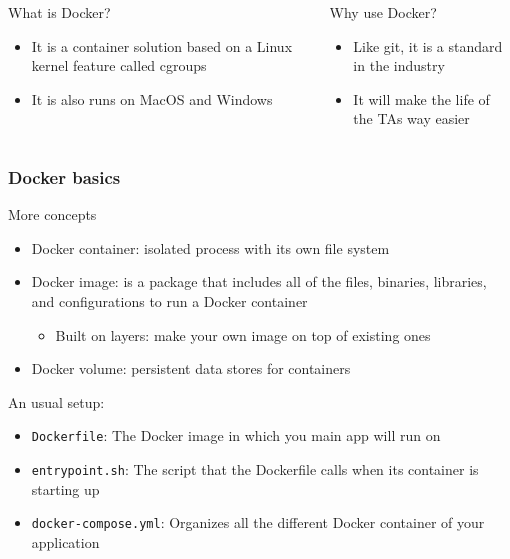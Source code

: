 \documentclass[fleqn,aspectratio=169,10pt]{beamer}
\begin{document}
\begin{frame}
\begin{columns}
\begin{column}{.45\textwidth}
\begin{block}{What is Docker?}
\begin{itemize}
            \pause
      \item It is a container solution based on a Linux kernel feature called cgroups
      \item It is also runs on MacOS and Windows
    \end{itemize}
  \end{block}
    \end{column}
    \pause
    \begin{column}{.45\textwidth}
      \begin{block}{Why use Docker?}
        \begin{itemize}
          \item Like git, it is a standard in the industry
          \item It will make the life of the TAs way easier
        \end{itemize}
      \end{block}
    \end{column}
  \end{columns}
\end{frame}

\begin{frame}[fragile]
  \frametitle{Docker basics}
  \pause
  \begin{block}{More concepts}
    \begin{itemize}
      \item Docker container: isolated process with its own file system
      \item Docker image: is a package that includes all of the files, binaries, libraries, and configurations to run a Docker container
            \begin{itemize}
              \item Built on layers: make your own image on top of existing ones
            \end{itemize}
            \item Docker volume: persistent data stores for containers
    \end{itemize}
  \end{block}
  \pause
  \begin{block}{An usual setup:}
    \begin{itemize}
      \item \texttt{Dockerfile}: The Docker image in which you main app will run on
      \item \texttt{entrypoint.sh}: The script that the Dockerfile calls when its container is starting up
      \item \texttt{docker-compose.yml}: Organizes all the different Docker container of your application
    \end{itemize}
  \end{block}
\end{frame}
\end{document}
